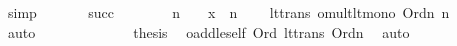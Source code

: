 \begin{isabellebody}
\ simp\ \isanewline
\ \ \ \ \isamarkupfalse%
\ {\isacartoucheopen}succ{\isacharparenleft}{\kern0pt}{\isasymalpha}{\isacharparenright}{\kern0pt}\ {\isacharless}{\kern0pt}\ {\isasymbeta}{\isacartoucheclose}\isanewline
\ \ \ \ \isamarkupfalse%
\ {\isachardoublequoteopen}n\ {\isacharasterisk}{\kern0pt}{\isacharasterisk}{\kern0pt}\ {\isasymalpha}\ {\isacharplus}{\kern0pt}{\isacharplus}{\kern0pt}\ x\ {\isacharless}{\kern0pt}\ n\ {\isacharasterisk}{\kern0pt}{\isacharasterisk}{\kern0pt}\ {\isasymbeta}{\isachardoublequoteclose}\ \isamarkupfalse%
\ lt{\isacharunderscore}{\kern0pt}trans\ omult{\isacharunderscore}{\kern0pt}lt{\isacharunderscore}{\kern0pt}mono\ {\isacartoucheopen}Ord{\isacharparenleft}{\kern0pt}n{\isacharparenright}{\kern0pt}{\isacartoucheclose}\ {\isacartoucheopen}{}{\isacharless}{\kern0pt}n{\isacartoucheclose}\ \ \isamarkupfalse%
\ auto\ \ \ \ \ \ \isanewline
\ \ \ \ \isamarkupfalse%
\ \isamarkupfalse%
\ {\isacharquery}{\kern0pt}thesis\ \isamarkupfalse%
\ oadd{\isacharunderscore}{\kern0pt}le{\isacharunderscore}{\kern0pt}self\ {\isacartoucheopen}Ord{\isacharparenleft}{\kern0pt}{\isasymbeta}{\isacharparenright}{\kern0pt}{\isacartoucheclose}\ lt{\isacharunderscore}{\kern0pt}trans{}\ {\isacartoucheopen}Ord{\isacharparenleft}{\kern0pt}n{\isacharparenright}{\kern0pt}{\isacartoucheclose}\ \isamarkupfalse%
\ auto\isanewline
\ \ \isamarkupfalse%
\isanewline
{}\isamarkupfalse%
%
\endisatagproof
{\isafoldproof}%
%
\isadelimproof
\isanewline
%
\endisadelimproof
%
\isadelimtheory
%
\endisadelimtheory
%
\isatagtheory
{}\isamarkupfalse%
%
\endisatagtheory
{\isafoldtheory}%
%
\isadelimtheory
%
\endisadelimtheory
%
\end{isabellebody}%
\endinput
